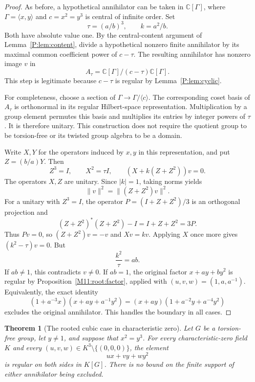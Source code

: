 \documentclass[11pt,a4paper,oneside]{report}
\newtheorem{theorem}{Theorem}[section]
\theoremstyle{definition}
\theoremstyle{remark}
\newcommand{\C}{\mathbb C}
\begin{document}
\begin{proof}
As before, a hypothetical annihilator can be taken in
$\C[\Gamma]$, where $\Gamma=\langle x,y\rangle$ and
$c=x^2=y^3$ is central of infinite order.  Set
\[
 \tau=(a/b)^3,\qquad k=a^2/b.
\]
Both have absolute value one.  By the central-content argument of
Lemma~\ref{P:lem:content}, divide a hypothetical nonzero finite
annihilator by its maximal common coefficient power of $c-\tau$.
The resulting annihilator has nonzero image $v$ in
\[
 A_\tau=\C[\Gamma]/(c-\tau)\C[\Gamma].
\]
This step is legitimate because $c-\tau$ is regular by
Lemma~\ref{P:lem:cyclic}.

For completeness, choose a section of
$\Gamma\longrightarrow\Gamma/\langle c\rangle$.
The corresponding coset basis of $A_\tau$ is orthonormal in its
regular Hilbert-space representation.  Multiplication by a group
element permutes this basis and multiplies its entries by integer
powers of $\tau$.  It is therefore unitary.  This construction
does not require the quotient group to be torsion-free or its
twisted group algebra to be a domain.

Write $X,Y$ for the operators induced by $x,y$ in this representation,
and put $Z=(b/a)Y$.  Then
\[
 Z^3=I,\qquad X^2=\tau I,\qquad
 (X+k(Z+Z^2))v=0.
\]
The operators $X,Z$ are unitary.  Since $|k|=1$, taking norms yields
\[
 \|v\|^2=\|(Z+Z^2)v\|^2.
\]
For a unitary with $Z^3=I$, the operator
$P=(I+Z+Z^2)/3$ is an orthogonal projection and
\[
 (Z+Z^2)^*(Z+Z^2)-I=I+Z+Z^2=3P.
\]
Thus $Pv=0$, so $(Z+Z^2)v=-v$ and $Xv=kv$.
Applying $X$ once more gives $(k^2-\tau)v=0$.  But
\[
 \frac{k^2}{\tau}=ab.
\]
If $ab\ne1$, this contradicts $v\ne0$.  If $ab=1$, the original
factor $x+ay+by^2$ is regular by Proposition~\ref{M11:root:factor},
applied with $(u,v,w)=(1,a,a^{-1})$.  Equivalently, the exact identity
\[
 (1+a^{-3}x)(x+ay+a^{-1}y^2)
   =(x+ay)(1+a^{-2}y+a^{-4}y^2)
\]
excludes the original annihilator.  This handles the boundary in all
cases.
\end{proof}

\begin{theorem}[The rooted cubic case in characteristic zero]
\label{M11:root:cubic}
Let $G$ be a torsion-free group, let $y\ne1$, and suppose that
$x^2=y^3$.  For every characteristic-zero field $K$ and every
$(u,v,w)\in K^3\setminus\{(0,0,0)\}$, the element
\[
 ux+vy+wy^2
\]
is regular on both sides in $K[G]$.  There is no bound on the finite
support of either annihilator being excluded.
\end{theorem}
\end{document}
